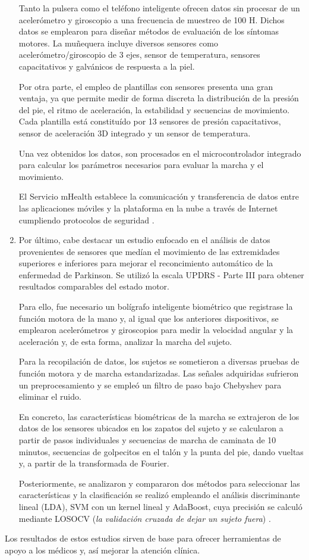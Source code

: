\begin{enumerate}
    Tanto la pulsera como el teléfono inteligente ofrecen datos sin procesar de un acelerómetro y giroscopio a una frecuencia de muestreo de 100 H. Dichos datos se emplearon para diseñar métodos de evaluación de los síntomas motores. La muñequera incluye diversos sensores como acelerómetro/giroscopio de 3 ejes, sensor de temperatura, sensores capacitativos y galvánicos de respuesta a la piel. 
    
    Por otra parte, el empleo de plantillas con sensores presenta una gran ventaja, ya que permite medir de forma discreta la distribución de la presión del pie, el ritmo de aceleración, la estabilidad y secuencias de movimiento. Cada plantilla está constituído por 13 sensores de presión capacitativos, sensor de aceleración 3D integrado y un sensor de temperatura.

    Una vez obtenidos los datos, son procesados en el microcontrolador integrado para calcular los parámetros necesarios para evaluar la marcha y el movimiento.

    El Servicio mHealth establece la comunicación y transferencia de datos entre las aplicaciones móviles y la plataforma en la nube a través de Internet cumpliendo protocolos de seguridad \cite{gatsios2020feasibility}.

    \item Por último, cabe destacar un estudio enfocado en el análisis de datos provenientes de sensores que medían el movimiento de las extremidades superiores e inferiores para mejorar el reconcimiento automático de la enfermedad de Parkinson. Se utilizó la escala UPDRS - Parte III para obtener resultados comparables del estado motor.

    Para ello, fue necesario un bolígrafo inteligente biométrico que registrase la función motora de la mano y, al igual que los anteriores dispositivos, se emplearon acelerómetros y giroscopios para medir la velocidad angular y la aceleración y, de esta forma, analizar la marcha del sujeto.

    Para la recopilación de datos, los sujetos se sometieron a diversas pruebas de función motora y de marcha estandarizadas. Las señales adquiridas sufrieron un preprocesamiento y se empleó un filtro de paso bajo Chebyshev para eliminar el ruido.

    En concreto, las características biométricas de la marcha se extrajeron de los datos de los sensores ubicados en los zapatos del sujeto y se calcularon a partir de pasos individuales y secuencias de marcha de caminata de 10 minutos, secuencias de golpecitos en el talón y la punta del pie, dando vueltas y, a partir de la transformada de Fourier.

    Posteriormente, se analizaron y compararon dos métodos para seleccionar las características y la clasificación se realizó empleando  el análisis discriminante lineal (LDA), SVM con un kernel lineal y AdaBoost, cuya precisión se calculó mediante LOSOCV (\textit{la validación cruzada de dejar un sujeto fuera})  \cite{barth2012combined}. 

\end{enumerate}

Los resultados de estos estudios sirven de base para ofrecer herramientas de apoyo a los médicos y, así mejorar la atención clínica. 





